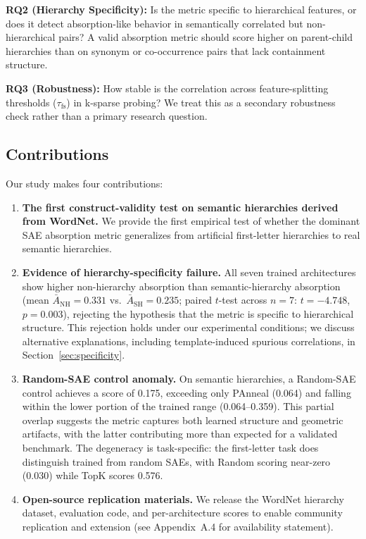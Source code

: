 \documentclass{article}
\begin{document}
\textbf{RQ2 (Hierarchy Specificity):} Is the metric specific to hierarchical features, or does it detect absorption-like behavior in semantically correlated but non-hierarchical pairs? A valid absorption metric should score higher on parent-child hierarchies than on synonym or co-occurrence pairs that lack containment structure.

\textbf{RQ3 (Robustness):} How stable is the correlation across feature-splitting thresholds ($\tau_{\text{fs}}$) in k-sparse probing? We treat this as a secondary robustness check rather than a primary research question.

\subsection{Contributions}

Our study makes four contributions:

\begin{enumerate}
\item \textbf{The first construct-validity test on semantic hierarchies derived from WordNet.} We provide the first empirical test of whether the dominant SAE absorption metric generalizes from artificial first-letter hierarchies to real semantic hierarchies.

\item \textbf{Evidence of hierarchy-specificity failure.} All seven trained architectures show higher non-hierarchy absorption than semantic-hierarchy absorption (mean $\bar{A}_{\text{NH}} = 0.331$ vs.~$\bar{A}_{\text{SH}} = 0.235$; paired $t$-test across $n=7$: $t = -4.748$, $p = 0.003$), rejecting the hypothesis that the metric is specific to hierarchical structure. This rejection holds under our experimental conditions; we discuss alternative explanations, including template-induced spurious correlations, in Section~\ref{sec:specificity}.

\item \textbf{Random-SAE control anomaly.} On semantic hierarchies, a Random-SAE control achieves a score of 0.175, exceeding only PAnneal (0.064) and falling within the lower portion of the trained range (0.064--0.359). This partial overlap suggests the metric captures both learned structure and geometric artifacts, with the latter contributing more than expected for a validated benchmark. The degeneracy is task-specific: the first-letter task does distinguish trained from random SAEs, with Random scoring near-zero (0.030) while TopK scores 0.576.

\item \textbf{Open-source replication materials.} We release the WordNet hierarchy dataset, evaluation code, and per-architecture scores to enable community replication and extension (see Appendix~A.4 for availability statement).
\end{enumerate}
\end{document}

